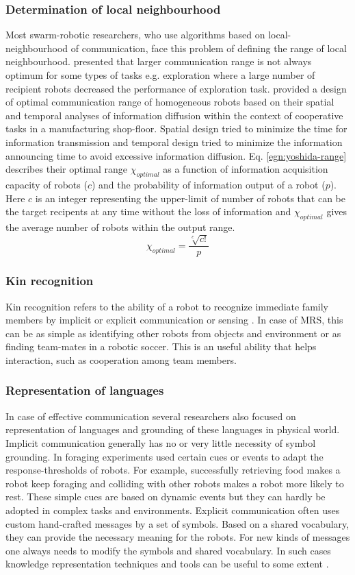 \subsubsection*{Determination of local neighbourhood}
Most swarm-robotic researchers, who use algorithms based on local-neighbourhood of communication, face this problem of defining the range of local neighbourhood.  presented that larger communication range is not always optimum for some types of tasks e.g. exploration where a large number of recipient robots decreased the performance of exploration task.  provided a design of optimal communication range of homogeneous robots based on their spatial and temporal analyses of information diffusion within the context of cooperative tasks in a manufacturing shop-floor. Spatial design tried to minimize the time for information transmission and temporal design tried to minimize the information announcing time to avoid excessive information diffusion. Eq. \ref{egn:yoshida-range} describes their optimal range $\chi_{optimal}$ as a function of information acquisition capacity of robots ($c$) and the probability of information output of a robot ($p$). Here $c$ is an integer representing the upper-limit of number of robots that can be the target recipents at any time without the loss of information and $\chi_{optimal}$ gives the average number of robots within the output range.
\begin{equation}
\chi_{optimal} = \frac{\sqrt [c] {c!}}{p}
\end{equation}
\subsubsection*{Kin recognition}
Kin recognition refers to the ability of a robot to recognize immediate family members by implicit or explicit communication or sensing \cite{Mataric2007}. In case of MRS, this can be as simple as identifying other robots from objects and environment or as finding team-mates in a robotic soccer. This is an useful ability that helps interaction, such as cooperation among team members. 
\subsubsection*{Representation of languages}
In case of effective communication several researchers also focused on representation of languages and grounding of these languages in physical world. Implicit communication generally has no or very little necessity of symbol grounding. In foraging experiments  used certain cues or events to adapt the response-thresholds  of robots. For example, successfully retrieving food makes a robot keep foraging and colliding with other robots makes a robot more likely to rest. These simple cues are based on dynamic events but they can hardly be adopted in complex tasks and environments. Explicit communication often uses custom hand-crafted messages by a set of symbols. Based on a shared vocabulary, they can provide the necessary meaning for the robots. For new kinds of messages one always needs to modify the symbols and shared vocabulary. In such cases knowledge representation techniques and tools can be useful to some extent \cite{Parker2008}.
